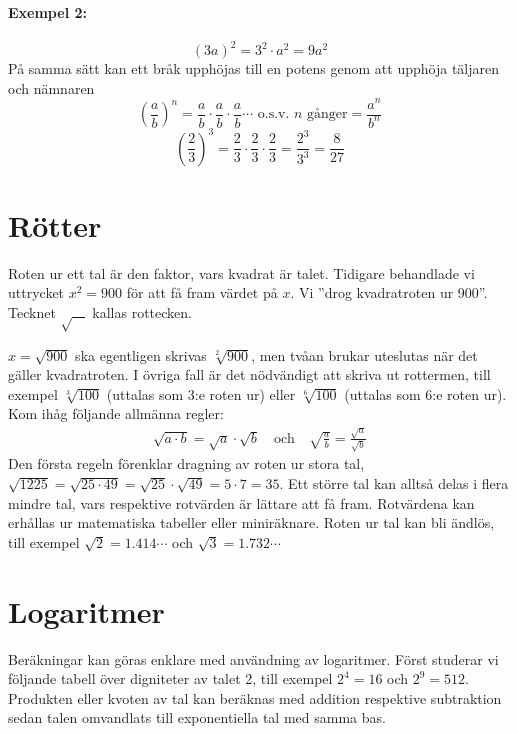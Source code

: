 \paragraph{Exempel 2:}
\[
(3a)^2 = 3^2 \cdot a^2 = 9a^2
\]
På samma sätt kan ett bråk upphöjas till en potens genom att upphöja täljaren
och nämnaren
\[
\left(\frac{a}{b}\right)^n =
\frac{a}{b} \cdot \frac{a}{b} \cdot \frac{a}{b} \cdots
\text{ o.s.v. }n\text{ gånger}
= \frac{a^n}{b^n}
\]
\[
\left(\frac{2}{3}\right)^3 = \frac{2}{3} \cdot \frac{2}{3} \cdot \frac{2}{3} =
\frac{2^3}{3^3} = \frac{8}{27}
\]

\section{Rötter}

Roten ur ett tal är den faktor, vars kvadrat är talet.
Tidigare behandlade vi uttrycket \(x^2 = 900\) för att få fram värdet på \(x\).
Vi ''drog kvadratroten ur 900''.
Tecknet \(\sqrt{\ \ \ \ }\) kallas rottecken.

\(x = \sqrt{900}\) ska egentligen skrivas \(\sqrt[2]{900}\),
men tvåan brukar uteslutas när det gäller kvadratroten.
I övriga fall är det nödvändigt att skriva ut rottermen, till exempel
\(\sqrt[3]{100}\) (uttalas som 3:e roten ur) eller \(\sqrt[6]{100}\)
(uttalas som 6:e roten ur).
Kom ihåg följande allmänna regler:
\begin{gather*}
  \sqrt{a \cdot b} = \sqrt{a} \cdot \sqrt{b}
  \quad \text{och} \quad
  \sqrt{\frac{a}{b}} = \frac{\sqrt{a}}{\sqrt{b}}
\end{gather*}
Den första regeln förenklar dragning av roten ur stora tal,
\(\sqrt{1225} = \sqrt{25 \cdot 49} = \sqrt{25} \cdot \sqrt{49} = 5 \cdot 7 = 35\).
Ett större tal kan alltså delas i flera mindre tal, vars respektive rotvärden är
lättare att få fram.
Rotvärdena kan erhållas ur matematiska tabeller eller miniräknare.
Roten ur tal kan bli ändlös, till exempel
\(\sqrt{2} = 1.414\cdots\) och \(\sqrt{3} = 1.732\cdots\)

\section{Logaritmer}
\label{logaritmer}

Beräkningar kan göras enklare med användning av logaritmer.
Först studerar vi följande tabell över digniteter av talet 2,
till exempel \(2^4 = 16\) och \(2^9 = 512\).
Produkten eller kvoten av tal kan beräknas med addition respektive subtraktion
sedan talen omvandlats till exponentiella tal med samma bas.

